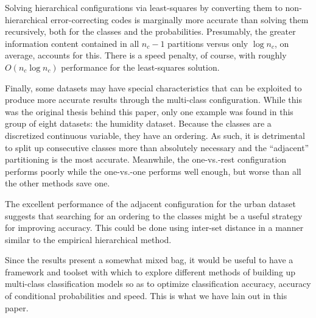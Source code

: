 Solving hierarchical configurations via least-squares by
converting them to non-hierarchical error-correcting codes is marginally more
accurate than solving them recursively, 
both for the classes and the probabilities.
Presumably, the greater information content contained in all $n_c-1$ partitions
versus only $\log n_c$, on average, accounts for this.
There is a speed penalty, of course, with roughly $O(n_c \log n_c)$ performance 
for the least-squares solution.

Finally, some datasets may have special characteristics that can be exploited
to produce more accurate results through the multi-class configuration.
While this was the original thesis behind this paper,
only one example was found in this group of eight datasets: 
the humidity dataset.
Because the classes are a discretized continuous variable, they have an
ordering. As such, it is detrimental to split up consecutive classes more
than absolutely necessary and the ``adjacent'' partitioning is the most
accurate. Meanwhile, the one-vs.-rest configuration performs poorly while
the one-vs.-one performs well enough, but worse than all the other methods
save one.

The excellent performance of the adjacent configuration for the urban
dataset suggests that searching for an ordering to the classes might be a
useful strategy for improving accuracy.
This could be done using inter-set distance in a manner similar to the empirical hierarchical method.

Since the results present a somewhat mixed bag, it would be useful to
have a framework and toolset with which to explore different methods of
building up multi-class classification models so as to optimize classification
accuracy, accuracy of conditional probabilities and speed.
This is what we have lain out in this paper.

